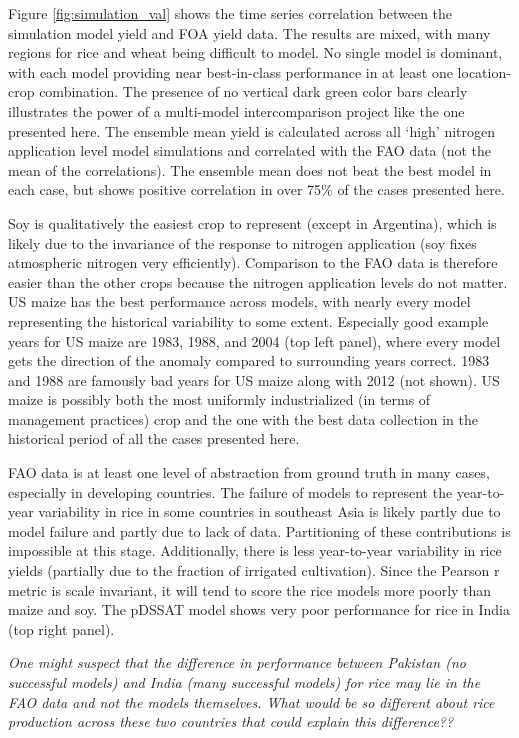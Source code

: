 \documentclass[preprint, 5p, times, twocolumn]{elsarticle}
\begin{document}
Figure \ref{fig:simulation_val} shows the time series correlation between the simulation model yield and FOA yield data. The results are mixed, with many regions for rice and wheat being difficult to model. No single model is dominant, with each model providing near best-in-class performance in at least one location-crop combination. The presence of no vertical dark green color bars clearly illustrates the power of a multi-model intercomparison project like the one presented here. The ensemble mean yield is calculated across all `high' nitrogen application level model simulations and correlated with the FAO data (not the mean of the correlations). The ensemble mean does not beat the best model in each case, but shows positive correlation in over 75\% of the cases presented here.

Soy is qualitatively the easiest crop to represent (except in Argentina), which is likely due to the invariance of the response to nitrogen application (soy fixes atmospheric nitrogen very efficiently). Comparison to the FAO data is therefore easier than the other crops because the nitrogen application levels do not matter. US maize has the best performance across models, with nearly every model representing the historical variability to some extent. Especially good example years for US maize are 1983, 1988, and 2004 (top left panel), where every model gets the direction of the anomaly compared to surrounding years correct. 1983 and 1988 are famously bad years for US maize along with 2012 (not shown). US maize is possibly both the most uniformly industrialized (in terms of management practices) crop and the one with the best data collection in the historical period of all the cases presented here.

FAO data is at least one level of abstraction from ground truth in many cases, especially in developing countries. The failure of models to represent the year-to-year variability in rice in some countries in southeast Asia is likely partly due to model failure and partly due to lack of data. Partitioning of these contributions is impossible at this stage. Additionally, there is less year-to-year variability in rice yields (partially due to the fraction of irrigated cultivation). Since the Pearson r metric is scale invariant, it will tend to score the rice models more poorly than maize and soy. The pDSSAT model shows very poor performance for rice in India (top right panel).

\textit{One might suspect that the difference in performance between Pakistan (no successful models) and India (many successful models) for rice may lie in the FAO data and not the models themselves. What would be so different about rice production across these two countries that could explain this difference??}
\end{document}
